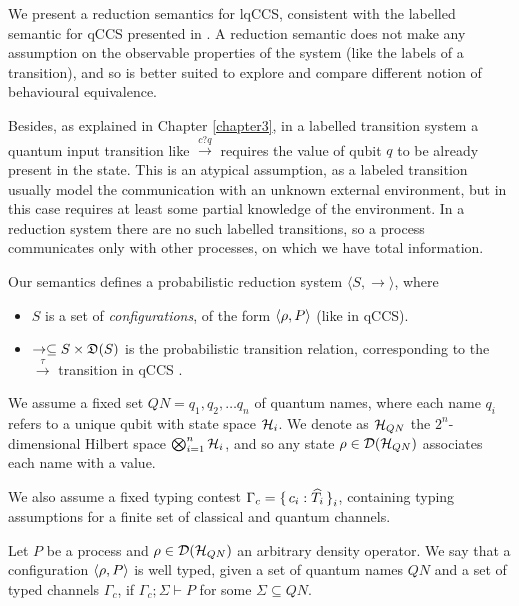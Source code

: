 We present a reduction semantics for lqCCS, consistent with the labelled semantic for qCCS presented in \cite{fengBisimulationQuantumProcesses2012, dengOpenBisimulationQuantum2012}. A reduction semantic does not make any assumption on the observable properties of the system (like the labels of a transition), and so is better suited to explore and compare different notion of behavioural equivalence.

Besides, as explained in Chapter \ref{chapter3}, in a labelled transition system a quantum input transition like $\xrightarrow{c?q}$ requires the value of qubit $q$ to be already present in the state. This is an atypical assumption, as a labeled transition usually model the communication with an unknown external environment, but in this case requires at least some partial knowledge of the environment. In a reduction system there are no such labelled transitions, so a process communicates only with other processes, on which we have total information.

Our semantics defines a probabilistic reduction system $\langle S, \rightarrow \rangle$, where \begin{itemize}
\item $S$ is a set of \textit{configurations}, of the form $\langle\rho, P\rangle$ (like in qCCS).
\item $\rightarrow \subseteq S \times \mathfrak{D}(S)$ is the probabilistic transition relation, corresponding to the $\xrightarrow{\tau}$ transition in qCCS \cite{fengBisimulationQuantumProcesses2012, dengOpenBisimulationQuantum2012}.
\end{itemize}

We assume a fixed set  $QN = {q_1, q_2, \ldots q_n}$ of quantum names, where each name $q_i$ refers to a unique qubit with state space $\mathcal{H}_i$. We denote as $\mathcal{H}_{QN}$ the $2^n$-dimensional Hilbert space $\bigotimes_{i=1}^n \mathcal{H}_i$, and so any state 
$\rho \in \mathcal{D}(\mathcal{H}_{QN})$ associates each name with a value.

We also assume a fixed typing contest $\Gamma_c = \set{c_i: \widehat{T_i}}_i$, containing typing assumptions for a finite set of classical and quantum channels.

\begin{definition}
Let $P$ be a process and $\rho \in \mathcal{D}(\mathcal{H}_{QN})$ an arbitrary density operator. We say that a configuration $\langle\rho, P\rangle$ is well typed, given a set of quantum names $QN$ and a set of typed channels $\Gamma_c$, if $\Gamma_c; \Sigma \vdash P$ for some $\Sigma \subseteq QN$.

\end{definition}

